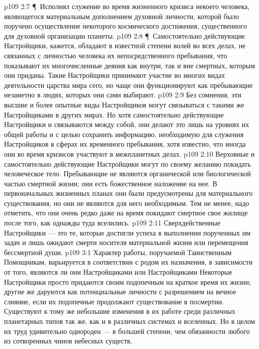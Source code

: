 \vs p109 2:7 \P\ \bibnobreakspace Исполнял служение во время жизненного кризиса некоего человека, являющегося материальным дополнением духовной личности, которой было поручено осуществление некоторого космического достижения, существенного для духовной организации планеты.
\vs p109 2:8 \P\ Самостоятельно действующие Настройщики, кажется, обладают в известной степени волей во всех делах, не связанных с личностью человека их непосредственного пребывания, что показывают их многочисленные деяния как внутри, так и вне смертных, которым они приданы. Такие Настройщики принимают участие во многих видах деятельности царства мира сего, но чаще они функционируют как пребывающие незаметно в людях, которых они сами выбирают.
\vs p109 2:9 Без сомнения, эти высшие и более опытные виды Настройщиков могут связываться с такими же Настройщиками в других мирах. Но хотя самостоятельно действующие Настройщики и связываются между собой, они делают это лишь на уровнях их общей работы и с целью сохранить информацию, необходимую для служения Настройщиков в сферах их временного пребывания, хотя известно, что иногда они во время кризисов участвуют в межпланетных делах.
\vs p109 2:10 Верховные и самостоятельно действующие Настройщики могут по своему желанию покидать человеческое тело. Пребывающие не являются органической или биологической частью смертной жизни; они есть божественное наложение на нее. В первоначальных жизненных планах они были предусмотрены для материального существования, но они не являются для него необходимым. Тем не менее, надо отметить, что они очень редко даже на время покидают смертное свое жилище после того, как однажды туда вселились.
\vs p109 2:11 Сверхдейственные Настройщики --- это те, которые достигли успеха в выполнении порученных им задач и лишь ожидают смерти носителя материальной жизни или перемещения бессмертной души.
\vs p109 3:1 Характер работы, поручаемой Таинственным Помощникам, варьируется в соответствии с родом их назначения, в зависимости от того, являются ли они Настройщиками  или Настройщиками  Некоторые Настройщики просто придаются своим подопечным на краткое время их жизни; другие же даруются как потенциальные личности с разрешением на вечное слияние, если их подопечные продолжают существование в посмертии. Существуют к тому же небольшие изменения в их работе среди различных планетарных типов так же, как и в различных системах и вселенных. Но в целом их труд удивительно однороден --- в большей степени, чем обязанности любого из сотворенных чинов небесных существ.
